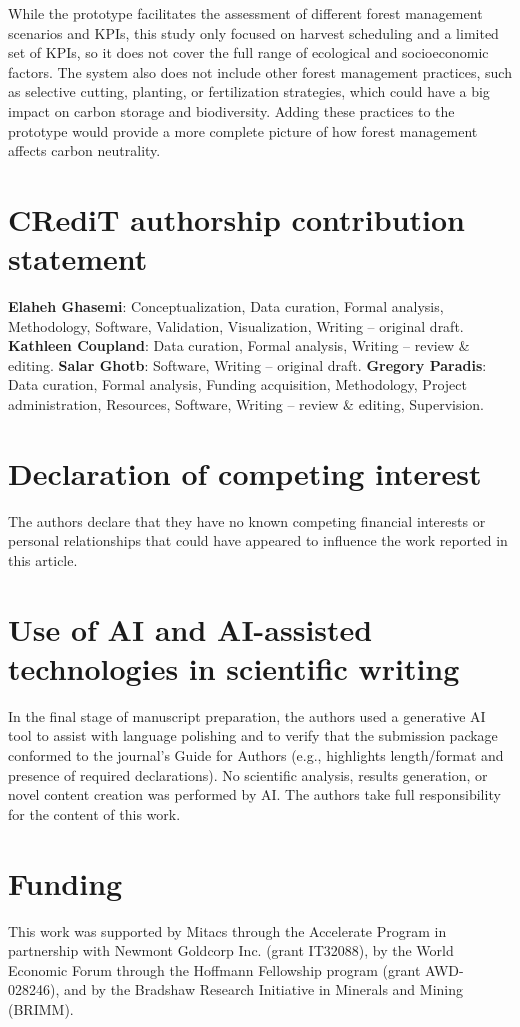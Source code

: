 \documentclass[preprint,12pt]{elsarticle}
\begin{document}
While the prototype facilitates the assessment of different forest management scenarios and KPIs, this study only focused on harvest scheduling and a limited set of KPIs, so it does not cover the full range of ecological and socioeconomic factors. The system also does not include other forest management practices, such as selective cutting, planting, or fertilization strategies, which could have a big impact on carbon storage and biodiversity. Adding these practices to the prototype would provide a more complete picture of how forest management affects carbon neutrality.


\section*{CRediT authorship contribution statement}
\label{sec: CRediT}
\textbf{Elaheh Ghasemi}: Conceptualization, Data curation, Formal analysis, Methodology, Software, Validation, Visualization, Writing – original draft. \textbf{Kathleen Coupland}: Data curation, Formal analysis, Writing – review \& editing. \textbf{Salar Ghotb}: Software, Writing – original draft. \textbf{Gregory Paradis}: Data curation, Formal analysis, Funding acquisition, Methodology, Project administration, Resources, Software, Writing – review \& editing, Supervision.

\section*{Declaration of competing interest}
\label{sec:Declaration of Competing Interest}
The authors declare that they have no known competing financial interests or personal relationships that could have appeared to influence the work reported in this article.

\section*{Use of AI and AI-assisted technologies in scientific writing}
In the final stage of manuscript preparation, the authors used a generative AI tool to assist with language polishing and to verify that the submission package conformed to the journal's Guide for Authors (e.g., highlights length/format and presence of required declarations). No scientific analysis, results generation, or novel content creation was performed by AI. The authors take full responsibility for the content of this work.

\section*{Funding}
This work was supported by Mitacs through the Accelerate Program in partnership with Newmont Goldcorp Inc. (grant IT32088), by the World Economic Forum through the Hoffmann Fellowship program (grant AWD-028246), and by the Bradshaw Research Initiative in Minerals and Mining (BRIMM).
\end{document}

